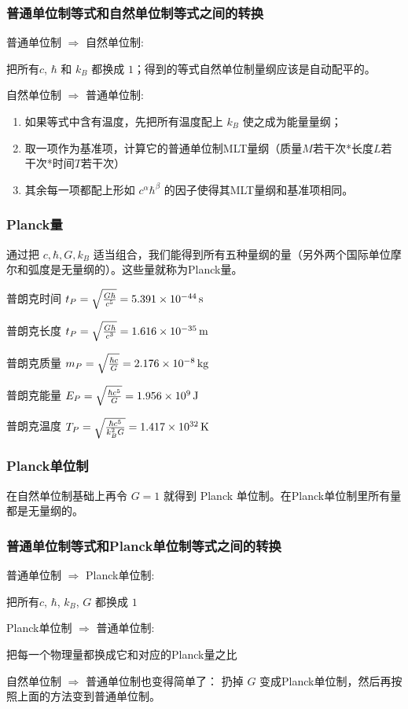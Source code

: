 \documentclass[CJK,13pt]{beamer}
\begin{document}
\begin{frame}
  \frametitle{普通单位制等式和自然单位制等式之间的转换}
  \bitem
\item{普通单位制 $\Rightarrow $ 自然单位制:

  把所有$c$, $\hbar$ 和 $k_B$ 都换成 $1$；得到的等式自然单位制量纲应该是自动配平的。}
\item{自然单位制 $\Rightarrow $ 普通单位制:
  \begin{enumerate}
  \item{如果等式中含有温度，先把所有温度配上 $k_B$ 使之成为能量量纲；}
  \item{取一项作为基准项，计算它的普通单位制MLT量纲（质量$M$若干次*长度$L$若干次*时间$T$若干次）}
  \item{其余每一项都配上形如 $c^\alpha\hbar^\beta$ 的因子使得其MLT量纲和基准项相同。}
\end{enumerate}}
  \eitem
\end{frame}

\begin{frame}
  \frametitle{Planck量}
  通过把 $c, \hbar, G, k_B$ 适当组合，我们能得到所有五种量纲的量（另外两个国际单位摩尔和弧度是无量纲的）。这些量就称为Planck量。

  普朗克时间 $t_P=\sqrt{\frac{G\hbar}{c^5}} = 5.391\times 10^{-44}\,\mathrm{s}$

  普朗克长度 $t_P=\sqrt{\frac{G\hbar}{c^3}} = 1.616\times 10^{-35}\,\mathrm{m}$  

  普朗克质量 $m_P = \sqrt{\frac{\hbar c}{G}} = 2.176\times 10^{-8}\,\mathrm{kg}$

  普朗克能量 $E_P = \sqrt{\frac{\hbar c^5}{G}} = 1.956\times 10^9 \,\mathrm{J}$

  普朗克温度 $T_P = \sqrt{\frac{\hbar c^5}{k_B^2G}} = 1.417 \times 10^{32}\,\mathrm{K}$
\end{frame}


\begin{frame}
  \frametitle{Planck单位制}
  在自然单位制基础上再令 $G=1$ 就得到 Planck 单位制。在Planck单位制里所有量都是无量纲的。

  \skiplines
  
\end{frame}


\begin{frame}
  \frametitle{普通单位制等式和Planck单位制等式之间的转换}
  \bitem
\item{普通单位制 $\Rightarrow $ Planck单位制:
  
  把所有$c$, $\hbar$, $k_B$, $G$ 都换成 $1$}
\item{Planck单位制 $\Rightarrow $ 普通单位制:
  
  把每一个物理量都换成它和对应的Planck量之比}
  \eitem

  \skiplines

  自然单位制 $\Rightarrow$ 普通单位制也变得简单了： 扔掉 $G$ 变成Planck单位制，然后再按照上面的方法变到普通单位制。
\end{frame}
\end{document}
